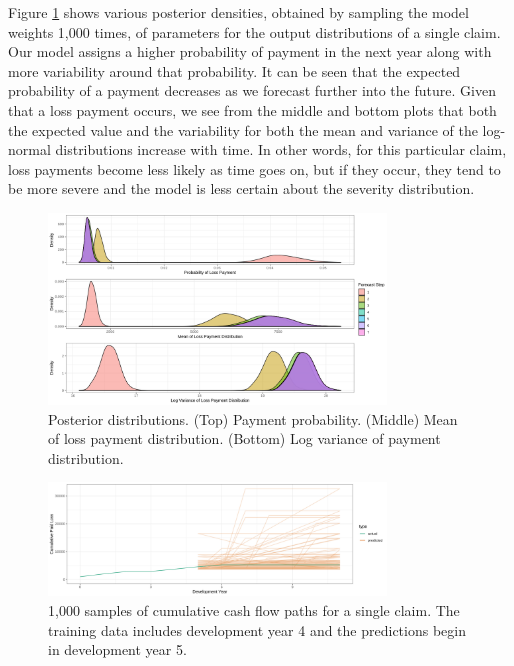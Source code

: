 \documentclass{article}
\begin{document}
Figure \ref{fig:prob_cash_flows} shows various posterior densities, obtained by sampling the model weights 1,000 times, of parameters for the output distributions of a single claim. Our model assigns a higher probability of payment in the next year along with more variability around that probability. It can be seen that the expected probability of a payment decreases as we forecast further into the future. Given that a loss payment occurs, we see from the middle and bottom plots that both the expected value and the variability for both the mean and variance of the log-normal distributions increase with time. In other words, for this particular claim, loss payments become less likely as time goes on, but if they occur, they tend to be more severe and the model is less certain about the severity distribution.

\begin{figure}
  \begin{center}
    \includegraphics[width=0.8\textwidth]{images/posteriors.png}
  \end{center}
  \caption{Posterior distributions. (Top) Payment probability. (Middle) Mean of loss payment distribution. (Bottom) Log variance of payment distribution.}
  \label{fig:prob_cash_flows}
\end{figure}

\begin{figure}
  \begin{center}
    \includegraphics[width=0.8\textwidth]{images/claim_paths.png}
  \end{center}
  \caption{1,000 samples of cumulative cash flow paths for a single claim. The training data includes development year 4 and the predictions begin in development year 5.}
  \label{fig:claim_paths}
\end{figure}
\end{document}
